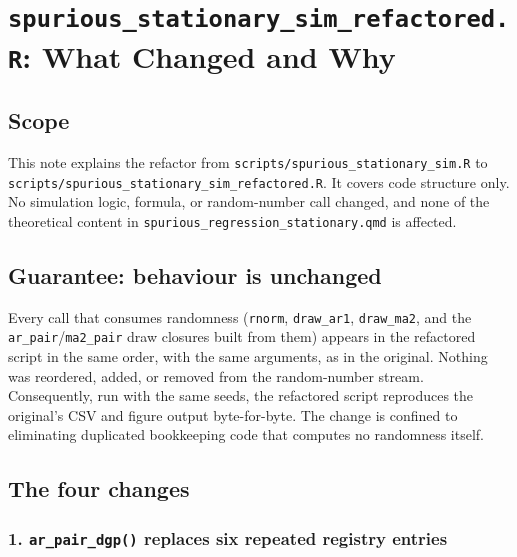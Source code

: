 \documentclass[
  letterpaper,
  DIV=11,
  numbers=noendperiod]{scrartcl}
\author{}
\date{}
\newcounter{none} %
\begin{document}
\section{\texorpdfstring{\texttt{spurious\_stationary\_sim\_refactored.R}:
What Changed and
Why}{spurious\_stationary\_sim\_refactored.R: What Changed and Why}}\label{spurious_stationary_sim_refactored.r-what-changed-and-why}

\subsection{Scope}\label{scope}

This note explains the refactor from
\texttt{scripts/spurious\_stationary\_sim.R} to
\texttt{scripts/spurious\_stationary\_sim\_refactored.R}. It covers code
structure only. No simulation logic, formula, or random-number call
changed, and none of the theoretical content in
\texttt{spurious\_regression\_stationary.qmd} is affected.

\subsection{Guarantee: behaviour is
unchanged}\label{guarantee-behaviour-is-unchanged}

Every call that consumes randomness (\texttt{rnorm}, \texttt{draw\_ar1},
\texttt{draw\_ma2}, and the \texttt{ar\_pair}/\texttt{ma2\_pair} draw
closures built from them) appears in the refactored script in the same
order, with the same arguments, as in the original. Nothing was
reordered, added, or removed from the random-number stream.
Consequently, run with the same seeds, the refactored script reproduces
the original's CSV and figure output byte-for-byte. The change is
confined to eliminating duplicated bookkeeping code that computes no
randomness itself.

\subsection{The four changes}\label{the-four-changes}

\subsubsection{\texorpdfstring{1. \texttt{ar\_pair\_dgp()} replaces six
repeated registry
entries}{1. ar\_pair\_dgp() replaces six repeated registry entries}}\label{ar_pair_dgp-replaces-six-repeated-registry-entries}
\end{document}
